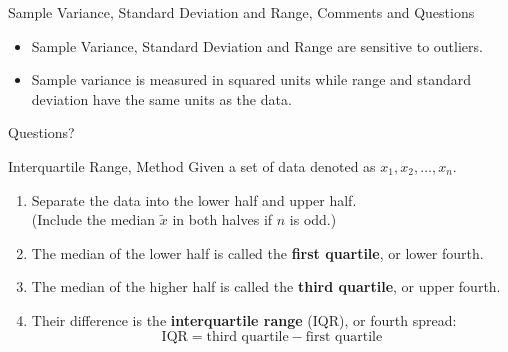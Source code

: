 \documentclass{beamer}
\newcommand{\blue}[1]{{\color{blue} #1}}
\newcommand{\red}[1]{{\color{red} #1}}
\newcommand{\qtns}[0]{\begin{center} Questions? \end{center}}
\begin{document}
\begin{frame}{Sample Variance, Standard Deviation and Range, Comments and Questions}
    \begin{itemize}
        \item Sample Variance, Standard Deviation and Range are sensitive to outliers.
        \item Sample variance is measured in squared units while range and standard deviation have the same units as the data.
    \end{itemize}
    \qtns
\end{frame}

\begin{frame}{Interquartile Range, Method}
    Given a set of data denoted as $x_1, x_2, \ldots, x_n$. \\
    \begin{enumerate}
        \item Separate the data into the lower half and upper half.\\
        (Include the median $\tilde{x}$ in both halves if $n$ is odd.)
        \item The median of the lower half is called the {\bf first quartile}, or lower fourth.
        \item The median of the higher half is called the {\bf third quartile}, or upper fourth. 
        \item Their difference is the {\bf interquartile range} (IQR), or fourth spread:
        $$\text{IQR} = \text{third quartile}-\text{first quartile}$$
        \end{enumerate}
\end{frame}

\end{document}
